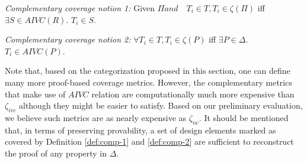 \begin{definition} {\emph{Complementary coverage notion 1:}}
  \label{def:comp-1}
   Given $ \Pi and \quad T_i \in T,  T_i \in \zeta(\Pi)$ iff $ \exists S
   \in AIVC(R)$. $T_i \in S$.
\end{definition}

\begin{definition} {\emph{Complementary coverage notion 2:}}
  \label{def:comp-2}
   $\forall T_i \in T,  T_i \in \zeta(P)$ iff $\exists P \in \Delta$. $T_i \in AIVC(P)$.
\end{definition}

Note that, based on the categorization proposed in this section, one can define many more proof-based coverage metrics. However, the complementary metrics that make use of $AIVC$ relation are computationally much more expensive than $\zeta_{ivc}$ although they might be easier to satisfy. Based on our preliminary evaluation, we believe such metrics are as nearly expensive as $\zeta_{nc}$. It should be mentioned that, in terms of preserving provability, a set of design elements marked as covered by Definition \ref{def:comp-1} and \ref{def:comp-2} are
sufficient to reconstruct the proof of any property in $\Delta$.




